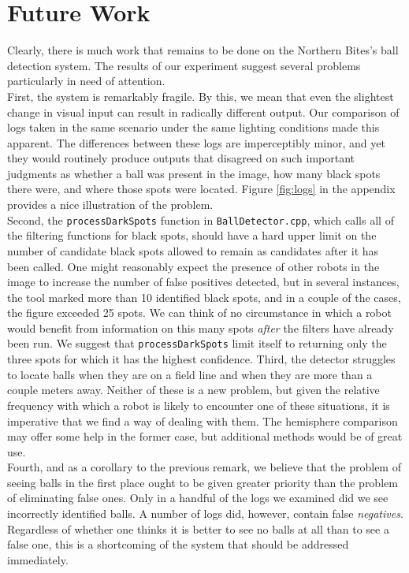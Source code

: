 \documentclass[11pt, twocolumn]{article}
\begin{document}
\section{Future Work}
Clearly, there is much work that remains to be done on the Northern Bites's ball detection system. The results of our experiment suggest several problems particularly in need of attention. \\
\indent First, the system is remarkably fragile. By this, we mean that even the slightest change in visual input can result in radically different output. Our comparison of logs taken in the same scenario under the same lighting conditions made this apparent. The differences between these logs are imperceptibly minor, and yet they would routinely produce outputs that disagreed on such important judgments as whether a ball was present in the image, how many black spots there were, and where those spots were located. Figure \ref{fig:logs} in the appendix provides a nice illustration of the problem. \\
\indent Second, the \texttt{processDarkSpots} function in \texttt{BallDetector.cpp}, which calls all of the filtering functions for black spots, should have a hard upper limit on the number of candidate black spots allowed to remain as candidates after it has been called. One might reasonably expect the presence of other robots in the image to increase the number of false positives detected, but in several instances, the tool marked more than 10 identified black spots, and in a couple of the cases, the figure exceeded 25 spots. We can think of no circumstance in which a robot would benefit from information on this many spots \emph{after} the filters have already been run. We suggest that \texttt{processDarkSpots} limit itself to returning only the three spots for which it has the highest confidence.
\indent Third, the detector struggles to locate balls when they are on a field line and when they are more than a couple meters away. Neither of these is a new problem, but given the relative frequency with which a robot is likely to encounter one of these situations, it is imperative that we find a way of dealing with them. The hemisphere comparison may offer some help in the former case, but additional methods would be of great use. \\
\indent Fourth, and as a corollary to the previous remark, we believe that the problem of seeing balls in the first place ought to be given greater priority than the problem of eliminating false ones. Only in a handful of the logs we examined did we see incorrectly identified balls. A number of logs did, however, contain false \emph{negatives}. Regardless of whether one thinks it is better to see no balls at all than to see a false one, this is a shortcoming of the system that should be addressed immediately.
\end{document}
